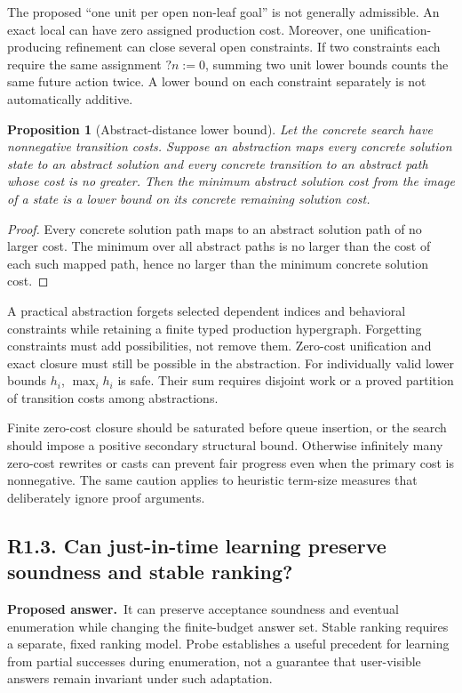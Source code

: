 \documentclass[11pt,a4paper]{article}
\newcommand{\question}[2]{\subsection{#1. #2}\label{q:#1}}
\newcommand{\answer}{\textbf{Proposed answer.}\ }
\newtheorem{proposition}{Proposition}[section]
\theoremstyle{remark}
\begin{document}
The proposed ``one unit per open non-leaf goal'' is not generally admissible.
An exact local can have zero assigned production cost. Moreover, one
unification-producing refinement can close several open constraints. If two
constraints each require the same assignment $\mathord?n:=0$, summing two
unit lower bounds counts the same future action twice. A lower bound on each
constraint separately is not automatically additive.

\begin{proposition}[Abstract-distance lower bound]\label{prop:heuristic}
Let the concrete search have nonnegative transition costs. Suppose an
abstraction maps every concrete solution state to an abstract solution and
every concrete transition to an abstract path whose cost is no greater.
Then the minimum abstract solution cost from the image of a state is a lower
bound on its concrete remaining solution cost.
\end{proposition}
\begin{proof}
Every concrete solution path maps to an abstract solution path of no larger
cost. The minimum over all abstract paths is no larger than the cost of each
such mapped path, hence no larger than the minimum concrete solution cost.
\end{proof}

A practical abstraction forgets selected dependent indices and behavioral
constraints while retaining a finite typed production hypergraph. Forgetting
constraints must add possibilities, not remove them. Zero-cost unification
and exact closure must still be possible in the abstraction. For individually
valid lower bounds $h_i$, $\max_i h_i$ is safe. Their sum requires disjoint
work or a proved partition of transition costs among abstractions.

Finite zero-cost closure should be saturated before queue insertion, or the
search should impose a positive secondary structural bound. Otherwise
infinitely many zero-cost rewrites or casts can prevent fair progress even
when the primary cost is nonnegative. The same caution applies to heuristic
term-size measures that deliberately ignore proof arguments.

\question{R1.3}{Can just-in-time learning preserve soundness and stable ranking?}

\answer It can preserve acceptance soundness and eventual enumeration while
changing the finite-budget answer set. Stable ranking requires a separate,
fixed ranking model. Probe establishes a useful precedent for learning from
partial successes during enumeration, not a guarantee that user-visible
answers remain invariant under such adaptation.\cite{probe}
\end{document}
